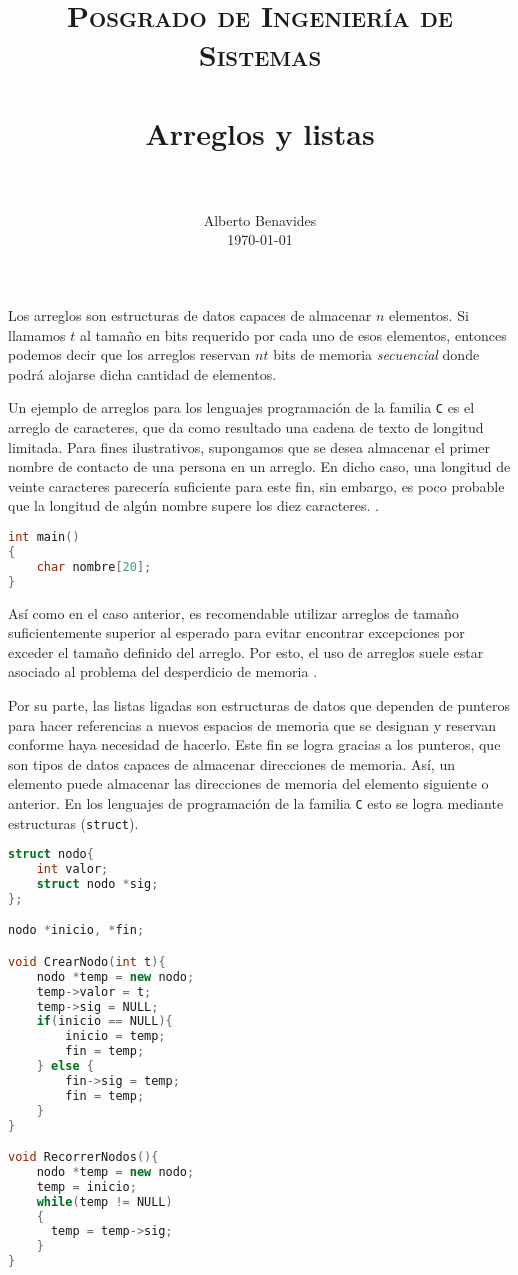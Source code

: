 \documentclass[paper=leter, fontsize=11pt]{scrartcl}
\title{
		\usefont{OT1}{bch}{b}{n}
		\normalfont \normalsize \textsc{Posgrado de Ingeniería de Sistemas} \\ [25pt]
		\horrule{0.5pt} \\[0.4cm]
		\huge Arreglos y listas \\
		\horrule{2pt} \\[0.5cm]
}
\author{
		\normalfont 								\normalsize
        Alberto Benavides\\[-3pt]		\normalsize
        \today
}
\date{}
\numberwithin{equation}{section}		%
\numberwithin{figure}{section}			%
\numberwithin{table}{section}				%
\begin{document}
\maketitle

Los arreglos son estructuras de datos capaces de almacenar $n$ elementos. Si llamamos $t$ al tamaño en bits requerido por cada uno de esos elementos, entonces podemos decir que los arreglos reservan $nt$ bits de memoria \textit{secuencial} donde podrá alojarse dicha cantidad de elementos. 

Un ejemplo de arreglos para los lenguajes programación de la familia \texttt{C} es el arreglo de caracteres, que da como resultado una cadena de texto de longitud limitada. Para fines ilustrativos, supongamos que se desea almacenar el primer nombre de contacto de una persona en un arreglo. En dicho caso, una longitud de veinte caracteres parecería suficiente para este fin, sin embargo, es poco probable que la longitud de algún nombre supere los diez caracteres. \cite{nombres}. 

\begin{lstlisting}[language=C++, caption=Arreglo de veinte caracteres en \texttt{C}.]
int main()
{
	char nombre[20];
}
\end{lstlisting}

Así como en el caso anterior, es recomendable utilizar arreglos de tamaño suficientemente superior al esperado para evitar encontrar excepciones por exceder el tamaño definido del arreglo. Por esto, el uso de arreglos suele estar asociado al problema del desperdicio de memoria \cite{arreglos}.

Por su parte, las listas ligadas son estructuras de datos que dependen de punteros para hacer referencias a nuevos espacios de memoria que se designan y reservan conforme haya necesidad de hacerlo. Este fin se logra gracias a los punteros, que son tipos de datos capaces de almacenar direcciones de memoria. Así, un elemento puede almacenar las direcciones de memoria del elemento siguiente o anterior. En los lenguajes de programación de la familia \texttt{C} esto se logra mediante estructuras (\texttt{struct}).

\begin{lstlisting}[language=C++, caption=Funciones para creación y recorrido de listas.]
struct nodo{
	int valor;
	struct nodo *sig;  
};

nodo *inicio, *fin;

void CrearNodo(int t){
    nodo *temp = new nodo;
    temp->valor = t;
    temp->sig = NULL;
    if(inicio == NULL){
        inicio = temp;
        fin = temp;
    } else {
        fin->sig = temp;
        fin = temp;
    }
}

void RecorrerNodos(){
    nodo *temp = new nodo;
    temp = inicio;
    while(temp != NULL)
    {
      temp = temp->sig;
    }
}
\end{lstlisting}
\end{document}
